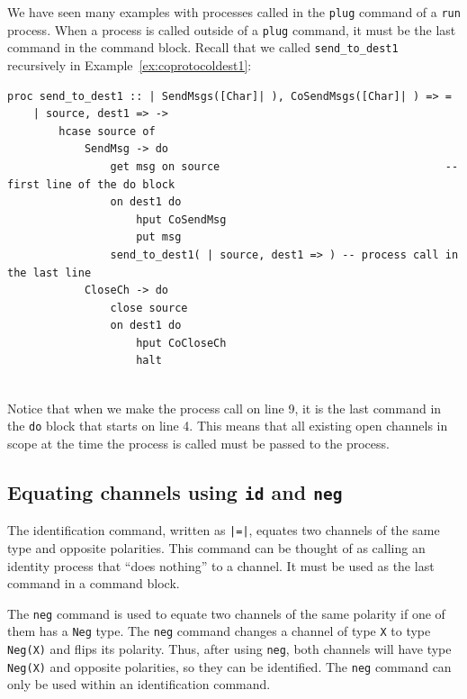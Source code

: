 \documentclass[11pt]{article}
\begin{document}
We have seen many examples with processes called in the \lstinline$plug$ command of a \lstinline$run$ process.
When a process is called outside of a \lstinline$plug$ command, it must be the last command in the command block.
Recall that we called \lstinline$send_to_dest1$ recursively in Example~\ref{ex:coprotocoldest1}:
\begin{lstlisting} 
proc send_to_dest1 :: | SendMsgs([Char]| ), CoSendMsgs([Char]| ) => =
	| source, dest1 => -> 
		hcase source of				
			SendMsg -> do							
				get msg on source 									-- first line of the do block
				on dest1 do
					hput CoSendMsg		
					put msg
				send_to_dest1( | source, dest1 => )	-- process call in the last line
			CloseCh -> do
				close source
				on dest1 do
					hput CoCloseCh
					halt
				
\end{lstlisting}
Notice that when we make the process call on line 9, it is the last command in the \lstinline$do$ block that starts on line 4.
This means that all existing open channels in scope at the time the process is called must be passed to the process.


\subsection{Equating channels using {\tt id} and {\tt neg}}
\label{sec:neg}

The identification command, written as \lstinline$|=|$, equates two channels of the same type and opposite polarities.
This command can be thought of as calling an identity process that ``does nothing'' to a channel.
It must be used as the last command in a command block.

The \lstinline$neg$ command is used to equate two channels of the same polarity if one of them has a \lstinline$Neg$ type.
The \lstinline$neg$ command changes a channel of type \lstinline$X$ to type \lstinline$Neg(X)$ and flips its polarity. 
Thus, after using \lstinline$neg$, both channels will have type \lstinline$Neg(X)$ and opposite polarities, so they can be identified.
The \lstinline$neg$ command can only be used within an identification command.
\end{document}
